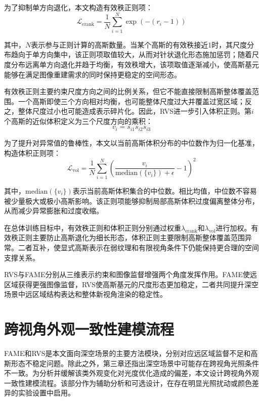 为了抑制单方向退化，本文构造有效秩正则项：
\begin{equation}
    \mathcal{L}_{\mathrm{erank}}=\frac{1}{N}\sum_{i=1}^{N}\exp\left(-(r_i-1)\right)
\end{equation}

其中，$N$表示参与正则计算的高斯数量。当某个高斯的有效秩接近1时，其尺度分布趋向于单方向集中，该正则项取值较大，从而对针状退化形态施加惩罚；随着尺度分布远离单方向退化并趋于均衡，有效秩增大，该项取值逐渐减小，使高斯基元能够在满足图像重建需求的同时保持更稳定的空间形态。

有效秩正则主要约束尺度方向之间的比例关系，但它不能直接限制高斯整体覆盖范围。一个高斯即使三个方向相对均衡，也可能整体尺度过大并覆盖过宽区域；反之，整体尺度过小也可能造成表示碎片化。因此，RVS进一步引入体积正则。第$i$个高斯的近似体积定义为三个尺度方向的乘积：
\begin{equation}
    v_i=s_{i1}s_{i2}s_{i3}
\end{equation}

为了提升对异常值的鲁棒性，本文以当前高斯体积分布的中位数作为归一化基准，构造体积正则项：
\begin{equation}
    \mathcal{L}_{\mathrm{vol}}=\frac{1}{N}\sum_{i=1}^{N}\left(\frac{v_i}{\mathrm{median}(\{v_i\})+\epsilon}-1\right)^2
\end{equation}

其中，$\mathrm{median}(\{v_i\})$表示当前高斯体积集合的中位数。相比均值，中位数不容易被少量极大或极小高斯影响。该正则项能够抑制局部高斯体积过度偏离整体分布，从而减少异常膨胀和过度收缩。

在总体训练目标中，有效秩正则和体积正则分别通过权重$\lambda_{\mathrm{erank}}$和$\lambda_{\mathrm{vol}}$进行加权。有效秩正则主要防止高斯退化为细长形态，体积正则主要限制高斯整体覆盖范围异常。二者互补，使显式高斯表示在弱纹理和有限视角条件下仍能保持更合理的空间支撑关系。

RVS与FAME分别从三维表示约束和图像监督增强两个角度发挥作用。FAME使远区域获得更强图像监督，RVS使高斯基元的尺度形态更加稳定，二者共同提升深空场景中远区域结构表达和整体新视角渲染的稳定性。

\section{跨视角外观一致性建模流程}

FAME和RVS是本文面向深空场景的主要方法模块，分别对应远区域监督不足和高斯形态不稳定问题。除此之外，第三章还指出深空场景中可能存在跨视角光照条件不一致。为分析并缓解该类外观变化对光度优化造成的偏差，本文设计跨视角外观一致性建模流程。该部分作为辅助分析和可选设计，在存在明显光照扰动或颜色差异的实验设置中启用。


